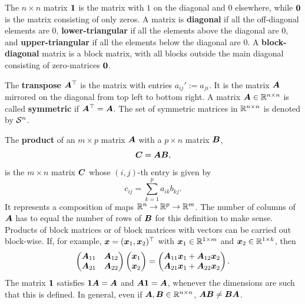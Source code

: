 \documentclass[11pt,a4paper]{memoir}
\begin{document}
  The $n\times n$ matrix $\bm{1}$ is the matrix with $1$ on the diagonal and $0$ elsewhere, while $\bm{0}$ is the matrix consisting of only zeros. A matrix is \textbf{diagonal} if all the off-diagonal elements are $0$, \textbf{lower-triangular} if all the elements above the diagonal are $0$, and \textbf{upper-triangular} if all the elements below the diagonal are $0$. A \textbf{block-diagonal} matrix is a block matrix, with all blocks outside the main diagonal consisting of zero-matrices $\bm{0}$.
  
The \textbf{transpose} $\bm{A}^{\top}$ is the matrix with entries $a_{ij}':= a_{ji}$. It is the matrix $\bm{A}$ mirrored on the diagonal from top left to bottom right.
A matrix $\bm{A}\in \mathbb{R}^{n\times n}$ is called \textbf{symmetric} if $\bm{A}^{\top} = \bm{A}$. The set of symmetric matrices in $\mathbb{R}^{n\times n}$ is denoted  by $\mathcal{S}^n$.

The \textbf{product} of an $m\times p$ matrix $\bm{A}$ with a $p\times n$ matrix $\bm{B}$, 
\begin{equation*}
  \bm{C} = \bm{A} \bm{B},
\end{equation*}
is the $m\times n$ matrix $\bm{C}$ whose $(i,j)$-th entry is given by
\begin{equation*}
  c_{ij} = \sum_{k=1}^p a_{ik}b_{kj}. 
\end{equation*}
It represents a composition of maps $\mathbb{R}^n\to \mathbb{R}^p\to \mathbb{R}^m$.
The number of columns of $\bm{A}$ has to equal the number of rows of $\bm{B}$ for this definition to make sense. 
Products of block matrices or of block matrices with vectors can be carried out block-wise. If, for example, $\bm{x}=(\bm{x}_1,\bm{x}_2)^{\top}$ with $\bm{x}_1\in \mathbb{R}^{1\times m}$ and $\bm{x}_2\in \mathbb{R}^{1\times k}$, then
\begin{equation*}
\begin{pmatrix} 
  \bm{A}_{11} & \bm{A}_{12}\\
  \bm{A}_{21} & \bm{A}_{22}
 \end{pmatrix} 
 \begin{pmatrix}
 \bm{x}_1\\
 \bm{x}_2
 \end{pmatrix} = \begin{pmatrix}
 \bm{A}_{11}\bm{x}_1+\bm{A}_{12}\bm{x}_2\\
 \bm{A}_{21}\bm{x}_1+\bm{A}_{22}\bm{x}_2
 \end{pmatrix}.
\end{equation*}
The matrix $\bm{1}$ satisfies $\bm{1} \bm{A} = \bm{A}$ and $\bm{A} \bm{1} = \bm{A}$, whenever the dimensions are such that this is defined. In general, even if $\bm{A},\bm{B}\in \mathbb{R}^{n\times n}$, $\bm{A}\bm{B}\neq \bm{B}\bm{A}$.
\end{document}
